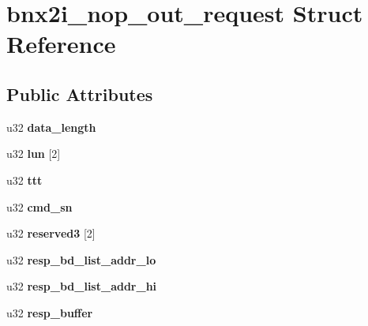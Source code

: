 \hypertarget{structbnx2i__nop__out__request}{
\section{bnx2i\_\-nop\_\-out\_\-request Struct Reference}
\label{structbnx2i__nop__out__request}
}
\subsection*{Public Attributes}
\begin{DoxyCompactItemize}
\item 
\hypertarget{structbnx2i__nop__out__request_a074d06e868e9b8bfe1076b53482c4b3b}{
u32 {\bfseries data\_\-length}}
\label{structbnx2i__nop__out__request_a074d06e868e9b8bfe1076b53482c4b3b}

\item 
\hypertarget{structbnx2i__nop__out__request_a8a136125f73c0b131e846427dc3e5402}{
u32 {\bfseries lun} \mbox{[}2\mbox{]}}
\label{structbnx2i__nop__out__request_a8a136125f73c0b131e846427dc3e5402}

\item 
\hypertarget{structbnx2i__nop__out__request_a5055aba0fe94668eae7e9dd5790d809c}{
u32 {\bfseries ttt}}
\label{structbnx2i__nop__out__request_a5055aba0fe94668eae7e9dd5790d809c}

\item 
\hypertarget{structbnx2i__nop__out__request_a18c7ba33199f30beead3a8d0061c1baa}{
u32 {\bfseries cmd\_\-sn}}
\label{structbnx2i__nop__out__request_a18c7ba33199f30beead3a8d0061c1baa}

\item 
\hypertarget{structbnx2i__nop__out__request_ae8f09a96e11583ed05eacd37a53248a9}{
u32 {\bfseries reserved3} \mbox{[}2\mbox{]}}
\label{structbnx2i__nop__out__request_ae8f09a96e11583ed05eacd37a53248a9}

\item 
\hypertarget{structbnx2i__nop__out__request_aa12074011bc3e1fd53e363c7a39b8640}{
u32 {\bfseries resp\_\-bd\_\-list\_\-addr\_\-lo}}
\label{structbnx2i__nop__out__request_aa12074011bc3e1fd53e363c7a39b8640}

\item 
\hypertarget{structbnx2i__nop__out__request_af70c64d473ac6d58a9fc30ef6f0d84fd}{
u32 {\bfseries resp\_\-bd\_\-list\_\-addr\_\-hi}}
\label{structbnx2i__nop__out__request_af70c64d473ac6d58a9fc30ef6f0d84fd}

\item 
\hypertarget{structbnx2i__nop__out__request_ab22f6699ab9ecd80685af2ecfa9bfa05}{
u32 {\bfseries resp\_\-buffer}}
\label{structbnx2i__nop__out__request_ab22f6699ab9ecd80685af2ecfa9bfa05}


\end{DoxyCompactItemize}
